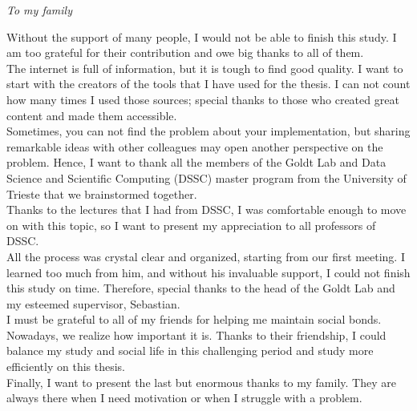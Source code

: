 \documentclass[a4paper, nobind]{templates/ociamthesis}
\begin{document}
\begin{romanpages}



\begin{dedication}
  \emph{To my family}
\end{dedication}

\begin{acknowledgements}
 	Without the support of many people, I would not be able to finish this study. I am too grateful for their contribution and owe big thanks to all of them.\\
The internet is full of information, but it is tough to find good quality. I want to start with the creators of the tools that I have used for the thesis. I can not count how many times I used those sources; special thanks to those who created great content and made them accessible.\\
Sometimes, you can not find the problem about your implementation, but sharing remarkable ideas with other colleagues may open another perspective on the problem. Hence, I want to thank all the members of the Goldt Lab and Data Science and Scientific Computing (DSSC) master program from the University of Trieste that we brainstormed together.\\
Thanks to the lectures that I had from DSSC, I was comfortable enough to move on with this topic, so I want to present my appreciation to all professors of DSSC.\\
All the process was crystal clear and organized, starting from our first meeting. I learned too much from him, and without his invaluable support, I could not finish this study on time. Therefore, special thanks to the head of the Goldt Lab and my esteemed supervisor, Sebastian.\\
I must be grateful to all of my friends for helping me maintain social bonds. Nowadays, we realize how important it is. Thanks to their friendship, I could balance my study and social life in this challenging period and study more efficiently on this thesis.\\
Finally, I want to present the last but enormous thanks to my family. They are always there when I need motivation or when I struggle with a problem.


\end{acknowledgements}
\end{romanpages}
\end{document}
